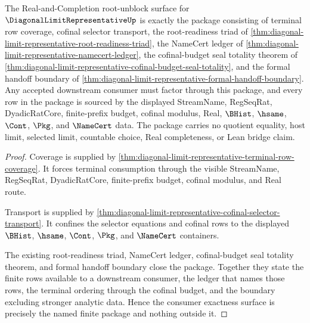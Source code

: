 \begin{theorem}
\label{thm:diagonal-limit-representative-real-completion-consumer-exactness}
The Real-and-Completion root-unblock surface for $\DiagonalLimitRepresentativeUp$ is exactly the package consisting of terminal row coverage, cofinal selector transport, the root-readiness triad of \autoref{thm:diagonal-limit-representative-root-readiness-triad}, the NameCert ledger of \autoref{thm:diagonal-limit-representative-namecert-ledger}, the cofinal-budget seal totality theorem of \autoref{thm:diagonal-limit-representative-cofinal-budget-seal-totality}, and the formal handoff boundary of \autoref{thm:diagonal-limit-representative-formal-handoff-boundary}. Any accepted downstream consumer must factor through this package, and every row in the package is sourced by the displayed StreamName, RegSeqRat, DyadicRatCore, finite-prefix budget, cofinal modulus, Real, $\BHist$, $\hsame$, $\Cont$, $\Pkg$, and $\NameCert$ data. The package carries no quotient equality, host limit, selected limit, countable choice, Real completeness, or Lean bridge claim.
\end{theorem}
\begin{proof}
Coverage is supplied by \autoref{thm:diagonal-limit-representative-terminal-row-coverage}. It forces terminal consumption through the visible StreamName, RegSeqRat, DyadicRatCore, finite-prefix budget, cofinal modulus, and Real route.

Transport is supplied by \autoref{thm:diagonal-limit-representative-cofinal-selector-transport}. It confines the selector equations and cofinal rows to the displayed $\BHist$, $\hsame$, $\Cont$, $\Pkg$, and $\NameCert$ containers.

The existing root-readiness triad, NameCert ledger, cofinal-budget seal totality theorem, and formal handoff boundary close the package. Together they state the finite rows available to a downstream consumer, the ledger that names those rows, the terminal ordering through the cofinal budget, and the boundary excluding stronger analytic data. Hence the consumer exactness surface is precisely the named finite package and nothing outside it.
\end{proof}

